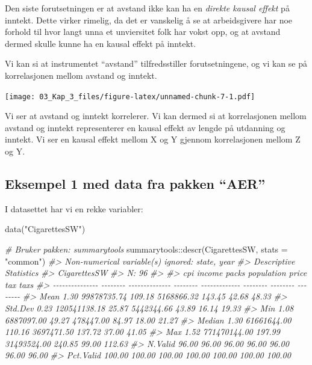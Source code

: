 \documentclass[
]{article}
\newenvironment{Shaded}{\begin{snugshade}}{\end{snugshade}}
\newcommand{\AttributeTok}[1]{\textcolor[rgb]{0.77,0.63,0.00}{#1}}
\newcommand{\CommentTok}[1]{\textcolor[rgb]{0.56,0.35,0.01}{\textit{#1}}}
\newcommand{\FunctionTok}[1]{\textcolor[rgb]{0.00,0.00,0.00}{#1}}
\newcommand{\NormalTok}[1]{#1}
\newcommand{\SpecialCharTok}[1]{\textcolor[rgb]{0.00,0.00,0.00}{#1}}
\newcommand{\StringTok}[1]{\textcolor[rgb]{0.31,0.60,0.02}{#1}}
\begin{document}
Den siste forutsetningen er at avstand ikke kan ha en \emph{direkte kausal effekt} på inntekt. Dette virker rimelig, da det er vanskelig å se at arbeidsgivere har noe forhold til hvor langt unna et unviersitet folk har vokst opp, og at avstand dermed skulle kunne ha en kausal effekt på inntekt.

Vi kan si at instrumentet ``avstand'' tilfredsstiller forutsetningene, og vi kan se på korrelasjonen mellom avstand og inntekt.

\texttt{[image: 03\_Kap\_3\_files/figure-latex/unnamed-chunk-7-1.pdf]}

Vi ser at avstand og inntekt korrelerer. Vi kan dermed si at korrelasjonen mellom avstand og inntekt representerer en kausal effekt av lengde på utdanning og inntekt. Vi ser en kausal effekt mellom X og Y gjennom korrelasjonen mellom Z og Y.

\hypertarget{eksempel-1-med-data-fra-pakken-aer}{%
\subsection{Eksempel 1 med data fra pakken ``AER''}\label{eksempel-1-med-data-fra-pakken-aer}}

I datasettet har vi en rekke variabler:

\begin{Shaded}
\begin{Highlighting}[]
\FunctionTok{data}\NormalTok{(}\StringTok{"CigarettesSW"}\NormalTok{)}

\CommentTok{\# Bruker pakken: summarytools}
\NormalTok{summarytools}\SpecialCharTok{::}\FunctionTok{descr}\NormalTok{(CigarettesSW, }\AttributeTok{stats =} \StringTok{"common"}\NormalTok{)}
\CommentTok{\#\textgreater{} Non{-}numerical variable(s) ignored: state, year}
\CommentTok{\#\textgreater{} Descriptive Statistics  }
\CommentTok{\#\textgreater{} CigarettesSW  }
\CommentTok{\#\textgreater{} N: 96  }
\CommentTok{\#\textgreater{} }
\CommentTok{\#\textgreater{}                      cpi         income    packs    population    price      tax     taxs}
\CommentTok{\#\textgreater{} {-}{-}{-}{-}{-}{-}{-}{-}{-}{-}{-}{-}{-}{-}{-} {-}{-}{-}{-}{-}{-}{-}{-} {-}{-}{-}{-}{-}{-}{-}{-}{-}{-}{-}{-}{-}{-} {-}{-}{-}{-}{-}{-}{-}{-} {-}{-}{-}{-}{-}{-}{-}{-}{-}{-}{-}{-}{-} {-}{-}{-}{-}{-}{-}{-}{-} {-}{-}{-}{-}{-}{-}{-}{-} {-}{-}{-}{-}{-}{-}{-}{-}}
\CommentTok{\#\textgreater{}            Mean     1.30    99878735.74   109.18    5168866.32   143.45    42.68    48.33}
\CommentTok{\#\textgreater{}         Std.Dev     0.23   120541138.18    25.87    5442344.66    43.89    16.14    19.33}
\CommentTok{\#\textgreater{}             Min     1.08     6887097.00    49.27     478447.00    84.97    18.00    21.27}
\CommentTok{\#\textgreater{}          Median     1.30    61661644.00   110.16    3697471.50   137.72    37.00    41.05}
\CommentTok{\#\textgreater{}             Max     1.52   771470144.00   197.99   31493524.00   240.85    99.00   112.63}
\CommentTok{\#\textgreater{}         N.Valid    96.00          96.00    96.00         96.00    96.00    96.00    96.00}
\CommentTok{\#\textgreater{}       Pct.Valid   100.00         100.00   100.00        100.00   100.00   100.00   100.00}
\end{Highlighting}
\end{Shaded}
\end{document}
